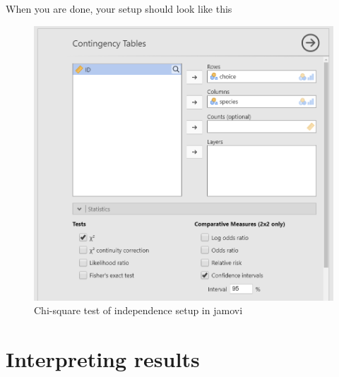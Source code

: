 \documentclass[
]{book}
\begin{document}
When you are done, your setup should look like this

\begin{figure}

{\centering \includegraphics[width=0.8\linewidth]{images/11-independence/independence_setup} 

}

\caption{Chi-square test of independence setup in jamovi}\label{fig:unnamed-chunk-2}
\end{figure}

\hypertarget{interpreting-results-6}{%
\section{Interpreting results}\label{interpreting-results-6}}
\end{document}

